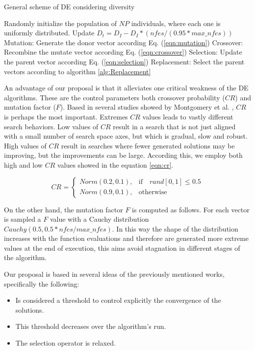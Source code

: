 \begin{algorithm}[H]
  \scriptsize
	\caption{General scheme of DE considering diversity} 
	\begin{algorithmic}[1]
	\STATE Randomly initialize the population of $NP$ individuals, where each one is uniformly distributed.
	\STATE Update $D_t = D_I - D_I *(nfes/(0.95*max\_nfes)) $ 
		\STATE Mutation: Generate the donor vector according Eq. (\ref{eqn:mutation})
		\STATE Crossover: Recombine the mutate vector according Eq. (\ref{eqn:crossover})
		\STATE Selection: Update the parent vector according  Eq. (\ref{eqn:selection})
		\STATE Replacement: Select the parent vectors according to algorithm \ref{alg:Replacement}
	   \ENDFOR
	\ENDWHILE
    \label{alg:Fase_Remplazo_VSD-MOEAD}
\end{algorithmic}
\end{algorithm}


An advantage of our proposal is that it alleviates one critical weakness of the DE algorithms.
%
These are the control parameters both crossover probability ($CR$) and mutation factor ($F$).
%
Based in several studies showed by Montgomery et al. \cite{montgomery2010analysis}, $CR$ is perhaps the most important.
%
Extremes $CR$ values leads to vastly different search behaviors.
%
Low values of $CR$ result in a search that is not just aligned with a small number of search space axes, but which is gradual, slow and robust.
%
High values of $CR$ result in searches where fewer generated solutions may be improving, but the improvements can be large.
%
According this, we employ both high and low $CR$ values showed in the equation \ref{eqn:cr}.

\begin{equation} \label{eqn:cr}
CR = 
\begin{cases}
     Norm(0.2, 0.1),& \text{if} \quad rand[0,1] \leq 0.5  \\
     Norm(0.9, 0.1),              & \text{otherwise}
\end{cases}
\end{equation}


On the other hand, the mutation factor $F$ is computed as follows.
%
For each vector is sampled a $F$ value with a Cauchy distribution $Cauchy(0.5, 0.5*nfes/max\_nfes)$.
%
In this way the shape of the distribution increases with the function evaluations and therefore are generated more extreme values at the end of execution, this aims avoid stagnation in different stages of the algorithm.
%


Our proposal is based in several ideas of the previously mentioned works, specifically the following:
\begin{itemize}
\item Is considered a threshold to control explicitly the convergence of the solutions.
\item This threshold decreases over the algorithm's run.
\item The selection operator is relaxed. 
\end{itemize}

